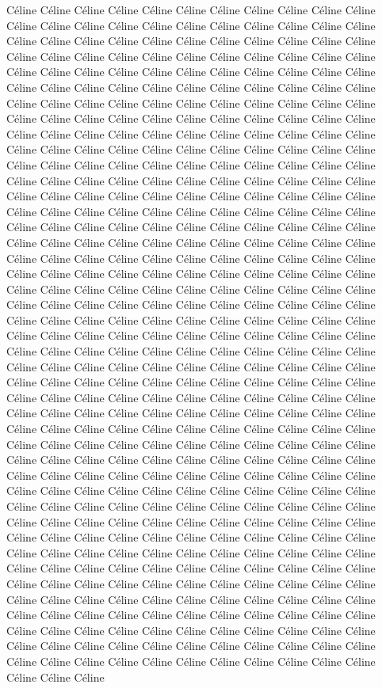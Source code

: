 \documentclass[10pt,a4paper]{article}
\begin{document}
Céline Céline Céline Céline Céline Céline Céline Céline Céline Céline Céline Céline Céline Céline Céline Céline Céline Céline Céline Céline Céline Céline Céline Céline Céline Céline Céline Céline Céline Céline Céline Céline Céline Céline Céline Céline Céline Céline Céline Céline Céline Céline Céline Céline Céline Céline Céline Céline Céline Céline Céline Céline Céline Céline Céline Céline Céline Céline Céline Céline Céline Céline Céline Céline Céline Céline Céline Céline Céline Céline Céline Céline Céline Céline Céline Céline Céline Céline Céline Céline Céline Céline Céline Céline Céline Céline Céline Céline Céline Céline Céline Céline Céline Céline Céline Céline Céline Céline Céline Céline Céline Céline Céline Céline Céline Céline Céline Céline Céline Céline Céline Céline Céline Céline Céline Céline Céline Céline Céline Céline Céline Céline Céline Céline Céline Céline Céline Céline Céline Céline Céline Céline Céline Céline Céline Céline Céline Céline Céline Céline Céline Céline Céline Céline Céline Céline Céline Céline Céline Céline Céline Céline Céline Céline Céline Céline Céline Céline Céline Céline Céline Céline Céline Céline Céline Céline Céline Céline Céline Céline Céline Céline Céline Céline Céline Céline Céline Céline Céline Céline Céline Céline Céline Céline Céline Céline Céline Céline Céline Céline Céline Céline Céline Céline Céline Céline Céline Céline Céline Céline  Céline Céline Céline Céline Céline Céline Céline Céline Céline Céline Céline Céline Céline Céline Céline Céline Céline Céline Céline Céline Céline Céline Céline Céline Céline Céline Céline Céline Céline Céline Céline Céline Céline Céline Céline Céline Céline Céline Céline Céline Céline Céline Céline Céline Céline Céline Céline Céline Céline Céline Céline Céline Céline Céline Céline Céline Céline Céline Céline Céline Céline Céline Céline Céline Céline Céline Céline Céline Céline Céline Céline Céline Céline Céline Céline Céline Céline Céline Céline Céline Céline Céline Céline Céline Céline Céline Céline Céline Céline Céline Céline Céline Céline Céline Céline Céline Céline Céline Céline Céline Céline Céline Céline Céline Céline Céline Céline Céline Céline Céline Céline Céline Céline Céline Céline Céline Céline Céline Céline Céline Céline Céline Céline Céline Céline Céline Céline Céline Céline Céline Céline Céline Céline Céline Céline Céline Céline Céline Céline Céline Céline Céline Céline Céline Céline Céline Céline Céline Céline Céline Céline Céline Céline Céline Céline Céline Céline Céline Céline Céline Céline Céline Céline Céline Céline Céline Céline Céline Céline Céline Céline Céline Céline Céline Céline Céline Céline Céline Céline Céline Céline Céline Céline Céline Céline Céline Céline Céline Céline Céline Céline Céline Céline Céline Céline Céline Céline Céline Céline Céline Céline Céline Céline Céline Céline Céline Céline Céline Céline Céline Céline Céline Céline Céline Céline Céline Céline Céline Céline Céline Céline Céline Céline Céline Céline Céline Céline Céline Céline Céline Céline Céline Céline Céline Céline Céline Céline Céline Céline Céline Céline Céline Céline Céline Céline Céline Céline Céline Céline Céline Céline Céline Céline Céline Céline Céline Céline Céline Céline Céline Céline Céline Céline Céline Céline Céline Céline Céline Céline Céline Céline Céline Céline Céline Céline Céline 
\end{document}
